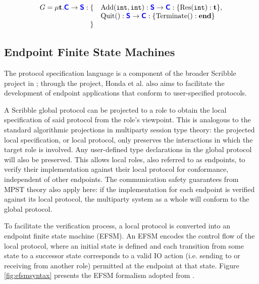 \[
\begin{array}{rl}
G = \mu\mathbf{t}.{\color{blue}\bm{\mathsf{C}}}\to{\color{blue}\bm{\mathsf{S}}}:\{
& \text{Add}(\texttt{int}, \texttt{int}): {\color{blue}\bm{\mathsf{S}}}\to{\color{blue}\bm{\mathsf{C}}}: \{\text{Res}(\texttt{int}): \mathbf{t}\}, \\
& \text{Quit}(): {\color{blue}\bm{\mathsf{S}}}\to{\color{blue}\bm{\mathsf{C}}}: \{\text{Terminate}(): \mathbf{end}\}\\
\} &
\end{array}
\]

\subsection{Endpoint Finite State Machines}
The protocol specification language is a component of the broader Scribble project in \cite{Scribble}; through the project, Honda et al. also aims to facilitate the development of endpoint applications that conform to user-specified protocols.

A Scribble global protocol can be projected to a role to obtain the local specification of said protocol from the role's viewpoint. This is analogous to the standard algorithmic projections in multiparty session type theory: the projected local specification, or local protocol, only preserves the interactions in which the target role is involved. Any user-defined type declarations in the global protocol will also be preserved. This allows local roles, also referred to as {endpoints}, to verify their implementation against their local protocol for conformance, independent of other endpoints. The communication safety guarantees from MPST theory also apply here: if the implementation for each endpoint is verified against its local protocol, the multiparty system as a whole will conform to the global protocol.

To facilitate the verification process, a local protocol is converted into 
an {endpoint finite state machine} (EFSM). An EFSM encodes the control flow of the local protocol, where an initial state is defined and each transition from some state to a successor state corresponds to a valid IO action (i.e. sending to or receiving from another role) permitted at the endpoint at that state. Figure \ref{fig:efsmsyntax} presents the EFSM formalism adopted from \cite{Hybrid2016}.

